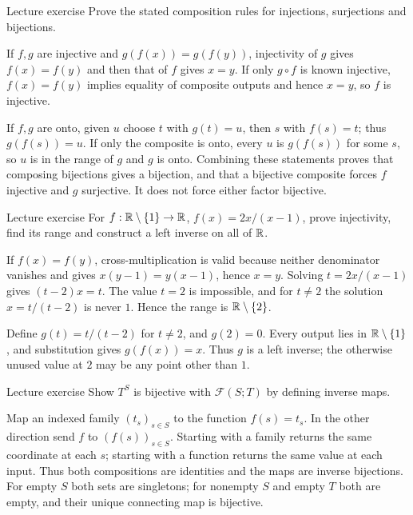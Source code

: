 \begin{exam}{Lecture exercise}
Prove the stated composition rules for injections, surjections and bijections.
\end{exam}
\begin{answer}
If $f,g$ are injective and $g(f(x))=g(f(y))$, injectivity of $g$ gives $f(x)=f(y)$ and then that of $f$ gives $x=y$. If only $g\circ f$ is known injective, $f(x)=f(y)$ implies equality of composite outputs and hence $x=y$, so $f$ is injective.

If $f,g$ are onto, given $u$ choose $t$ with $g(t)=u$, then $s$ with $f(s)=t$; thus $g(f(s))=u$. If only the composite is onto, every $u$ is $g(f(s))$ for some $s$, so $u$ is in the range of $g$ and $g$ is onto. Combining these statements proves that composing bijections gives a bijection, and that a bijective composite forces $f$ injective and $g$ surjective. It does not force either factor bijective.
\end{answer}
\begin{exam}{Lecture exercise}
For $f:\mathbb R\setminus\{1\}\to\mathbb R$, $f(x)=2x/(x-1)$, prove injectivity, find its range and construct a left inverse on all of $\mathbb R$.
\end{exam}
\begin{answer}
If $f(x)=f(y)$, cross-multiplication is valid because neither denominator vanishes and gives $x(y-1)=y(x-1)$, hence $x=y$. Solving $t=2x/(x-1)$ gives $(t-2)x=t$. The value $t=2$ is impossible, and for $t\ne2$ the solution $x=t/(t-2)$ is never $1$. Hence the range is $\mathbb R\setminus\{2\}$.

Define $g(t)=t/(t-2)$ for $t\ne2$, and $g(2)=0$. Every output lies in $\mathbb R\setminus\{1\}$, and substitution gives $g(f(x))=x$. Thus $g$ is a left inverse; the otherwise unused value at $2$ may be any point other than $1$.
\end{answer}
\begin{exam}{Lecture exercise}
Show $T^S$ is bijective with $\mathcal F(S;T)$ by defining inverse maps.
\end{exam}
\begin{answer}
Map an indexed family $(t_s)_{s\in S}$ to the function $f(s)=t_s$. In the other direction send $f$ to $(f(s))_{s\in S}$. Starting with a family returns the same coordinate at each $s$; starting with a function returns the same value at each input. Thus both compositions are identities and the maps are inverse bijections. For empty $S$ both sets are singletons; for nonempty $S$ and empty $T$ both are empty, and their unique connecting map is bijective.
\end{answer}
